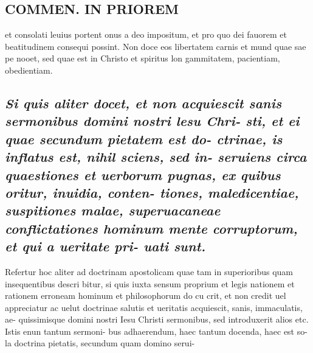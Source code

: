 \documentclass{article}
\begin{document}
\begin{pages}
\section*{COMMEN. IN PRIOREM }
\marginpar{[ p.156 ]}\pstart et consolati leuius portent onus a deo impositum, et pro quo dei fauorem et beatitudinem consequi possint. Non doce eos libertatem carnis et mund quae sae pe nooet, sed quae est in Christo et spiritus lon gammitatem, pacientiam, obedientiam.  \pend
{}
{}
\subsection*{\textit{Si quis aliter docet, et non acquiescit sanis sermonibus domini nostri lesu Chri- sti, et ei quae secundum pietatem est do- ctrinae, is inflatus est, nihil sciens, sed in- seruiens circa quaestiones et uerborum pugnas, ex quibus oritur, inuidia, conten- tiones, maledicentiae, suspitiones malae, superuacaneae conflictationes hominum mente corruptorum, et qui a ueritate pri- uati sunt. }}\pstart Refertur hoc aliter ad doctrinam apostolicam quae tam in superioribus quam insequentibus descri bitur, si quis iuxta sensum proprium et legis nationem et rationem erroneam hominum et philosophorum do cu crit, et non credit uel appreciatur ac uelut doctrinae salutis et ueritatis acquiescit, sanis, immaculatis, ae- quissimisque domini nostri Iesu Christi sermonibus, sed introduxerit alios etc. Istis enun tantum sermoni- bus adhaerendum, haec tantum docenda, haec est so- la doctrina pietatis, secundum quam domino serui-  \pend

\end{pages}
\end{document}
